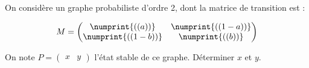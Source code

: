 \exercice
On considère un graphe probabiliste d'ordre 2, dont la matrice de transition est :

\[
M=\begin{pmatrix}
  \numprint{(( a ))} & \numprint{(( 1-a ))} \\
  \numprint{(( 1-b ))} & \numprint{(( b ))} \\
\end{pmatrix}
\]

On note $P=\begin{pmatrix}x&y\end{pmatrix}$ l'état stable de ce graphe. Déterminer $x$ et $y$.
